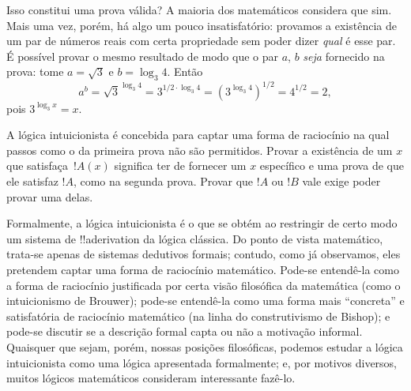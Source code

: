\documentclass[../../../include/open-logic-chapter]{subfiles}
\begin{document}
Isso constitui uma prova válida? A maioria dos matemáticos considera
que sim. Mais uma vez, porém, há algo um pouco insatisfatório: provamos
a existência de um par de números reais com certa propriedade sem
poder dizer \emph{qual} é esse par. É possível provar o mesmo resultado
de modo que o par $a$, $b$ \emph{seja} fornecido na prova: tome
$a = \sqrt{3}$ e $b = \log_3 4$. Então
\[
a^b = \sqrt{3}^{\log_3 4} = 3^{1/2 \cdot \log_3 4} = (3^{\log_3
  4})^{1/2} = 4^{1/2}= 2,
\]
pois $3^{\log_3 x} = x$.

A lógica intuicionista é concebida para captar uma forma de raciocínio
na qual passos como o da primeira prova não são permitidos. Provar a
existência de um $x$ que satisfaça~$!A(x)$ significa ter de fornecer um
$x$ específico e uma prova de que ele satisfaz $!A$, como na segunda
prova. Provar que $!A$ ou $!B$ vale exige poder provar uma delas.

Formalmente, a lógica intuicionista é o que se obtém ao restringir de
certo modo um sistema de !!a{derivation} da lógica clássica. Do ponto
de vista matemático, trata-se apenas de sistemas dedutivos formais;
contudo, como já observamos, eles pretendem captar uma forma de
raciocínio matemático. Pode-se entendê-la como a forma de raciocínio
justificada por certa visão filosófica da matemática (como o
intuicionismo de Brouwer); pode-se entendê-la como uma forma mais
``concreta'' e satisfatória de raciocínio matemático (na linha do
construtivismo de Bishop); e pode-se discutir se a descrição formal
capta ou não a motivação informal. Quaisquer que sejam, porém, nossas
posições filosóficas, podemos estudar a lógica intuicionista como uma
lógica apresentada formalmente; e, por motivos diversos, muitos
lógicos matemáticos consideram interessante fazê-lo.
\end{document}
